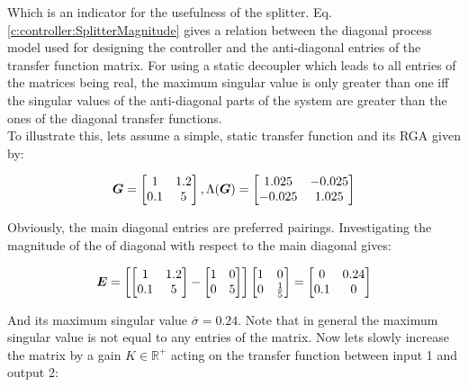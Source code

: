 Which is an indicator for the usefulness of the splitter. Eq.\ref{c:controller:SplitterMagnitude} gives a relation between the diagonal process model used for designing the controller and the anti-diagonal entries of the transfer function matrix. For using a static decoupler which leads to all entries of the matrices being real, the maximum singular value is only greater than one iff the singular values of the anti-diagonal parts of the system are greater than the ones of the diagonal transfer functions.\\

To illustrate this, lets assume a simple, static transfer function and its RGA given by:

\begin{align*}
\mbox{\boldmath$G$} = \begin{bmatrix}
1 & 1.2 \\
0.1 & 5
\end{bmatrix}, \Lambda(\mbox{\boldmath$G$}) = \begin{bmatrix}
1.025 & -0.025 \\
-0.025 & 1.025
\end{bmatrix}
\end{align*}

Obviously, the main diagonal entries are preferred pairings. Investigating the magnitude of the of diagonal with respect to the main diagonal gives:

\begin{align*}
\mbox{\boldmath$E$} = \left[ \begin{bmatrix}
1 & 1.2 \\ 0.1 & 5
\end{bmatrix} - \begin{bmatrix}
1 & 0 \\ 0 & 5
\end{bmatrix} \right]\begin{bmatrix}
1 & 0 \\ 0 & \frac{1}{5}
\end{bmatrix} = \begin{bmatrix}
0 & 0.24 \\ 0.1 & 0
\end{bmatrix} 
\end{align*}

And its maximum singular value $\overline{\sigma} = 0.24$. Note that in general the maximum singular value is not equal to any entries of the matrix. Now lets slowly increase the matrix by a gain $K \in \mathbb{R}^+$ acting on the transfer function between input 1 and output 2:

